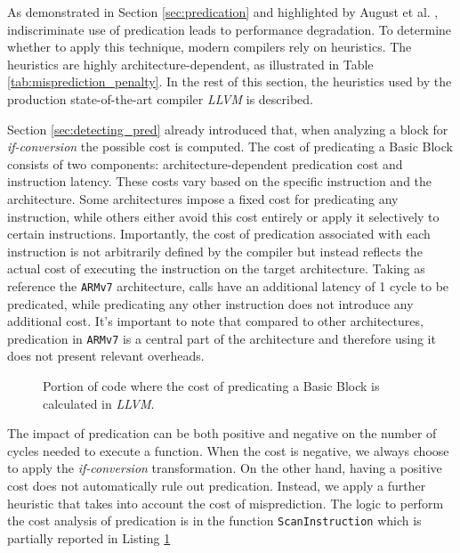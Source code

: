 As demonstrated in Section \ref{sec:predication} and highlighted by August et al. \cite{August98}, indiscriminate use of predication leads to performance degradation.
To determine whether to apply this technique, modern compilers rely on heuristics. The heuristics are highly architecture-dependent, as illustrated in Table \ref{tab:misprediction_penalty}. In the rest of this section, the heuristics used by the production state-of-the-art compiler \textit{LLVM} is described.

Section \ref{sec:detecting_pred} already introduced that, when analyzing a block for \textit{if-conversion} the possible cost is computed. The cost of predicating a Basic Block consists of two components: architecture-dependent predication cost and instruction latency. These costs vary based on the specific instruction and the architecture. Some architectures impose a fixed cost for predicating any instruction, while others either avoid this cost entirely or apply it selectively to certain instructions. Importantly, the cost of predication associated with each instruction is not arbitrarily defined by the compiler but instead reflects the actual cost of executing the instruction on the target architecture. Taking as reference the \texttt{ARMv7} architecture, calls have an additional latency of 1 cycle to be predicated, while predicating any other instruction does not introduce any additional cost. It's important to note that compared to other architectures, predication in \texttt{ARMv7} is a central part of the architecture and therefore using it does not present relevant overheads.

\begin{figure}[H]
    \centering
    
    \caption[Predication Cost Calculation]{Portion of code where the cost of predicating a Basic Block is calculated in \textit{LLVM}.}
    \label{lst:predication_cost}
\end{figure}

The impact of predication can be both positive and negative on the number of cycles needed to execute a function. When the cost is negative, we always choose to apply the \textit{if-conversion} transformation. On the other hand, having a positive cost does not automatically rule out predication. Instead, we apply a further heuristic that takes into account the cost of misprediction.
The logic to perform the cost analysis of predication is in the function \texttt{ScanInstruction} which is partially reported in Listing \ref{lst:predication_cost}

